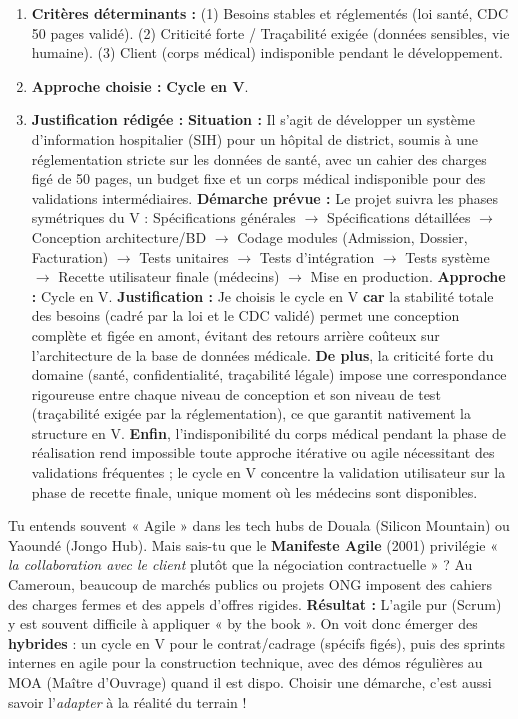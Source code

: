 \documentclass[11pt]{article}
\begin{document}
\begin{corrige}
\begin{enumerate}
    \item \textbf{Critères déterminants :} (1) Besoins stables et réglementés (loi santé, CDC 50 pages validé). (2) Criticité forte / Traçabilité exigée (données sensibles, vie humaine). (3) Client (corps médical) indisponible pendant le développement.
    \item \textbf{Approche choisie :} \textbf{Cycle en V}.
    \item \textbf{Justification rédigée :}
    \textbf{Situation :} Il s'agit de développer un système d'information hospitalier (SIH) pour un hôpital de district, soumis à une réglementation stricte sur les données de santé, avec un cahier des charges figé de 50 pages, un budget fixe et un corps médical indisponible pour des validations intermédiaires.
    \textbf{Démarche prévue :} Le projet suivra les phases symétriques du V : Spécifications générales $\rightarrow$ Spécifications détaillées $\rightarrow$ Conception architecture/BD $\rightarrow$ Codage modules (Admission, Dossier, Facturation) $\rightarrow$ Tests unitaires $\rightarrow$ Tests d'intégration $\rightarrow$ Tests système $\rightarrow$ Recette utilisateur finale (médecins) $\rightarrow$ Mise en production.
    \textbf{Approche :} Cycle en V.
    \textbf{Justification :} Je choisis le cycle en V \textbf{car} la stabilité totale des besoins (cadré par la loi et le CDC validé) permet une conception complète et figée en amont, évitant des retours arrière coûteux sur l'architecture de la base de données médicale. \textbf{De plus}, la criticité forte du domaine (santé, confidentialité, traçabilité légale) impose une correspondance rigoureuse entre chaque niveau de conception et son niveau de test (traçabilité exigée par la réglementation), ce que garantit nativement la structure en V. \textbf{Enfin}, l'indisponibilité du corps médical pendant la phase de réalisation rend impossible toute approche itérative ou agile nécessitant des validations fréquentes ; le cycle en V concentre la validation utilisateur sur la phase de recette finale, unique moment où les médecins sont disponibles.
\end{enumerate}
\end{corrige}

\begin{savaistu}
Tu entends souvent « Agile » dans les tech hubs de Douala (Silicon Mountain) ou Yaoundé (Jongo Hub). Mais sais-tu que le \textbf{Manifeste Agile} (2001) privilégie « \emph{la collaboration avec le client} plutôt que la négociation contractuelle » ? Au Cameroun, beaucoup de marchés publics ou projets ONG imposent des cahiers des charges fermes et des appels d'offres rigides. \textbf{Résultat :} L'agile pur (Scrum) y est souvent difficile à appliquer « by the book ». On voit donc émerger des \textbf{hybrides} : un cycle en V pour le contrat/cadrage (spécifs figés), puis des sprints internes en agile pour la construction technique, avec des démos régulières au MOA (Maître d'Ouvrage) quand il est dispo. Choisir une démarche, c'est aussi savoir l'\emph{adapter} à la réalité du terrain !
\end{savaistu}
\end{document}

